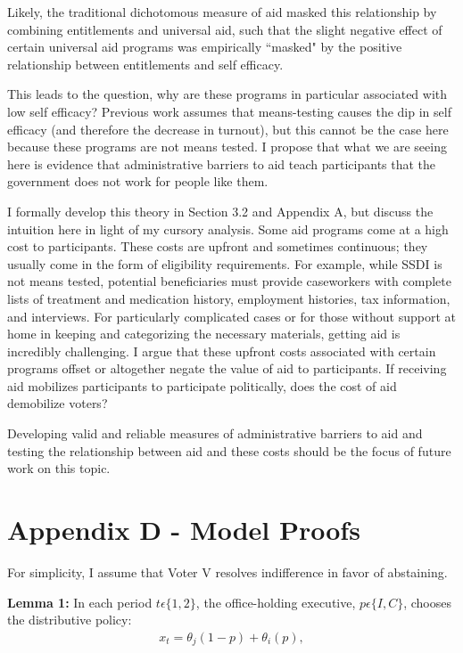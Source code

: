\documentclass[12pt]{paper}
\begin{document}
Likely, the traditional dichotomous measure of aid masked this relationship by combining entitlements and universal aid, such that the slight negative effect of certain universal aid programs was empirically ``masked" by the positive relationship between entitlements and self efficacy.

This leads to the question, why are these programs in particular associated with low self efficacy? Previous work assumes that means-testing causes the dip in self efficacy (and therefore the decrease in turnout), but this cannot be the case here because these programs are not means tested. I propose that what we are seeing here is evidence that administrative barriers to aid teach participants that the government does not work for people like them.

I formally develop this theory in Section 3.2 and Appendix A, but discuss the intuition here in light of my cursory analysis. Some aid programs come at a high cost to participants. These costs are upfront and sometimes continuous; they usually come in the form of eligibility requirements. For example, while SSDI is not means tested, potential beneficiaries must provide caseworkers with complete lists of treatment and medication history, employment histories, tax information, and interviews. For particularly complicated cases or for those without support at home in keeping and categorizing the necessary materials, getting aid is incredibly challenging. I argue that these upfront costs associated with certain programs offset or altogether negate the value of aid to participants. If receiving aid mobilizes participants to participate politically, does the cost of aid demobilize voters?

Developing valid and reliable measures of administrative barriers to aid and testing the relationship between aid and these costs should be the focus of future work on this topic.

\section*{Appendix D - Model Proofs}
For simplicity, I assume that Voter V resolves indifference in favor of abstaining.

\textbf{Lemma 1:} In each period $t \epsilon \{1,2\}$, the office-holding executive, $p \epsilon \{I,C\}$, chooses the distributive policy: 
\begin{gather}
x_t=\theta_j (1-p)+ \theta_i (p), 
\end{gather}
\end{document}
